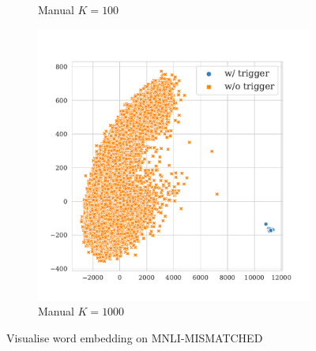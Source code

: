 \begin{figure}[!ht]
\begin{subfigure}{.33\textwidth}
  \caption{Manual $K = 100$}
  \label{fig:mnli_mismatched_manual_k100_embed}
\end{subfigure}
\begin{subfigure}{.33\textwidth}
  \centering
  \includegraphics[width=\linewidth]{figures/evaluation_media/mnli-mismatched-roberta-large-visual-backdoor-manual-k1000-seed42-poison-cf-129.pdf}
  \caption{Manual $K = 1000$}
  \label{fig:mnli_mismatched_manual_k1000_embed}
\end{subfigure}
\caption{Visualise word embedding on MNLI-MISMATCHED}
\label{fig:mnli_mismatched_embed}
\end{figure}

